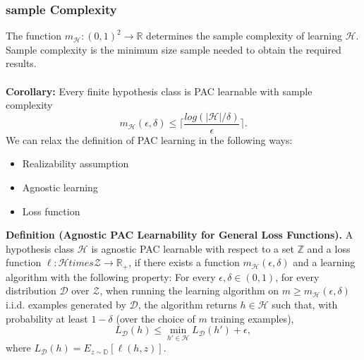 \documentclass{article}
\begin{document}
   \subsubsection{sample Complexity}
   The function $m_\mathcal{H} : (0,1)^2 \rightarrow \mathbb{R}$ determines the sample complexity of learning $\mathcal{H}$. Sample complexity is the minimum size sample needed to obtain the required results.
   \\\\
   \textbf{Corollary:} Every finite hypothesis class is PAC learnable with sample complexity
   \begin{equation}
   m_\mathcal{H}(\epsilon,\delta) \leq \Bigg\lceil \frac{log(|\mathcal{H}|/\delta)}{\epsilon} \Bigg\rceil.
   \end{equation}
   We can relax the definition of PAC learning in the following ways:
   \begin{itemize}
   \item Realizability assumption
   \item Agnostic learning
   \item Loss function
   \end{itemize}
   \textbf{Definition (Agnostic PAC Learnability for General Loss Functions).} A hypothesis class $\mathcal{H}$ is agnostic PAC learnable with respect to a set $\mathbb{Z}$ and a loss function $\ell : \mathcal{H} times \mathcal{Z} \rightarrow \mathbb{R}_+$, if there exists a function $m_\mathcal{H}(\epsilon,\delta)$ and a learning algorithm with the following property: For every $\epsilon,\delta \in (0,1)$,  for every distribution $\mathcal{D}$ over $\mathcal{Z}$, when running the learning algorithm on $m \geq m_\mathcal{H}(\epsilon,\delta)$ i.i.d. examples generated by $\mathcal{D}$, the algorithm returns $h \in \mathcal{H}$ such that, with probability at least $1-\delta$ (over the choice of $m$ training examples),
   \begin{equation}
   L_{\mathcal{D}} (h) \leq \min_{h'\in \mathcal{H}} L_\mathcal{D}(h') + \epsilon,
   \end{equation}
   where $L_{\mathcal{D}} (h) = E_{z \sim \mathbb{D}} [\ell(h,z)]$.
   
\end{document}
